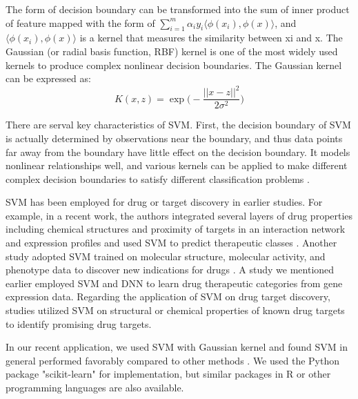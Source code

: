       The form of decision boundary can be transformed into the sum of inner product of feature mapped with the form of $\sum_{i=1}^m \alpha_i y_i \langle \phi(x_i), \phi(x) \rangle$, and $\langle \phi(x_i), \phi(x) \rangle$ is a kernel that measures the similarity between xi and x. The Gaussian (or radial basis function, RBF) kernel is one of the most widely used kernels to produce complex nonlinear decision boundaries. The Gaussian kernel can be expressed as: 
      \begin{equation}
        K(x, z) = \exp \bigg( - \frac{||x-z||^2}{2 \sigma^2} \bigg)
      \end{equation}

      There are serval key characteristics of SVM. First, the decision boundary of SVM is actually determined by observations near the boundary, and thus data points far away from the boundary have little effect on the decision boundary. It models nonlinear relationships well, and various kernels can be applied to make different complex decision boundaries to satisfy different classification problems \cite{bishop2006pattern}.

      SVM has been employed for drug or target discovery in earlier studies. For example, in a recent work, the authors integrated several layers of drug properties including chemical structures and proximity of targets in an interaction network and expression profiles and used SVM to predict therapeutic classes \cite{napolitano2013drug}. Another study adopted SVM trained on molecular structure, molecular activity, and phenotype data to discover new indications for drugs \cite{wang2013drug}. A study we mentioned earlier \cite{aerts2007pharmacological} employed SVM and DNN to learn drug therapeutic categories from gene expression data. Regarding the application of SVM on drug target discovery, studies \cite{bakheet2009properties,li2007prediction} utilized SVM on structural or chemical properties of known drug targets to identify promising drug targets.

      In our recent application, we used SVM with Gaussian kernel and found SVM in general performed favorably compared to other methods \cite{zhao2018drug}. We used the Python package "scikit-learn" \cite{pedregosa2011scikit,buitinck2013api} for implementation, but similar packages in R or other programming languages are also available.

